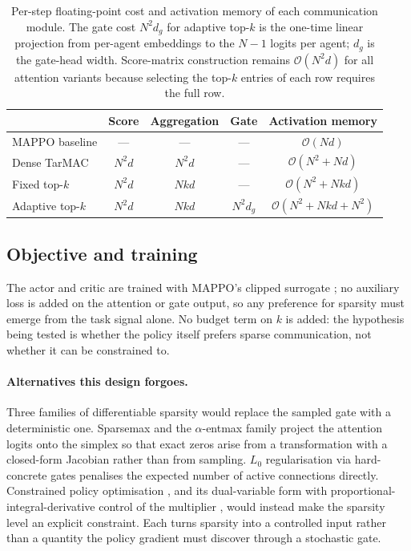 \begin{table}[h]
\centering
\small
\begin{tabular}{lcccc}
\toprule
                  & Score      & Aggregation & Gate     & Activation memory \\
\midrule
MAPPO baseline    & ---        & ---         & ---      & $\mathcal{O}(Nd)$ \\
Dense TarMAC      & $N^2 d$    & $N^2 d$     & ---      & $\mathcal{O}(N^2 + Nd)$ \\
Fixed top-$k$     & $N^2 d$    & $N k d$     & ---      & $\mathcal{O}(N^2 + Nkd)$ \\
Adaptive top-$k$  & $N^2 d$    & $N k d$     & $N^2 d_g$ & $\mathcal{O}(N^2 + Nkd + N^2)$ \\
\bottomrule
\end{tabular}
\caption{Per-step floating-point cost and activation memory of each
communication module. The gate cost $N^2 d_g$ for adaptive top-$k$ is the
one-time linear projection from per-agent embeddings to the $N{-}1$ logits
per agent; $d_g$ is the gate-head width. Score-matrix construction
remains $\mathcal{O}(N^2 d)$ for all attention variants because
selecting the top-$k$ entries of each row requires the full row.}
\label{tab:complexity}
\end{table}

\subsection{Objective and training}
The actor and critic are trained with MAPPO's clipped surrogate
\citep{yu2022mappo, schulman2017ppo}; no auxiliary loss is added on the
attention or gate output, so any preference for sparsity must emerge from
the task signal alone. No budget term on $k$ is added: the hypothesis
being tested is whether the policy itself prefers sparse communication,
not whether it can be constrained to.

\paragraph{Alternatives this design forgoes.} Three families of
differentiable sparsity would replace the sampled gate with a
deterministic one. Sparsemax \citep{martins2016sparsemax} and the
$\alpha$-entmax family \citep{peters2019entmax} project the attention
logits onto the simplex so that exact zeros arise from a transformation
with a closed-form Jacobian rather than from sampling. $L_0$
regularisation via hard-concrete gates \citep{louizos2018l0} penalises the
expected number of active connections directly. Constrained policy
optimisation \citep{achiam2017cpo}, and its dual-variable form with
proportional-integral-derivative control of the multiplier
\citep{stooke2020pidlagrangian}, would instead make the sparsity level an
explicit constraint. Each turns sparsity into a controlled input rather
than a quantity the policy gradient must discover through a stochastic
gate.
